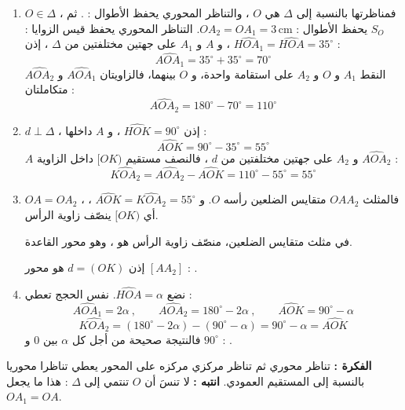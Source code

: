 \documentclass[12pt,a4paper]{article}
\newcommand{\cm}{\,\mathrm{cm}}
\begin{document}
\begin{corr}[title={تركيب : تناظر محوري ثم مركزي}, stars=4, source={Axiomaths}]
\begin{enumerate}[itemsep=14pt]
\begin{center}
\begin{tikzpicture}[scale=0.8]
  \end{tikzpicture}
  \end{center}
  \item $O\in\Delta$ ، فمناظرتها بالنسبة إلى $\Delta$ هي $O$ ، والتناظر المحوري يحفظ الأطوال : \ib{$OA_1=OA=3\cm$}. ثم $S_O$ يحفظ الأطوال : $OA_2=OA_1=3\cm$.
  التناظر المحوري يحفظ قيس الزوايا : $\widehat{HOA_1}=\widehat{HOA}=35^\circ$ ، و $A$ و $A_1$ على جهتين مختلفتين من $\Delta$ ، إذن :
  \[\widehat{AOA_1}=35^\circ+35^\circ=70^\circ\]
  النقط $A_1$ و $O$ و $A_2$ على استقامة واحدة، و $O$ بينهما، فالزاويتان $\widehat{AOA_1}$ و $\widehat{AOA_2}$ متكاملتان :
  \[\widehat{AOA_2}=180^\circ-70^\circ=110^\circ\]
  \item $d\perp\Delta$ ، إذن $\widehat{HOK}=90^\circ$ ، و $A$ داخلها :
  \[\widehat{AOK}=90^\circ-35^\circ=55^\circ\]
  $A$ و $A_2$ على جهتين مختلفتين من $d$ ، فالنصف مستقيم $[OK)$ داخل الزاوية $\widehat{AOA_2}$ :
  \[\widehat{KOA_2}=\widehat{AOA_2}-\widehat{AOK}=110^\circ-55^\circ=55^\circ\]
  \item $OA=OA_2$ ، فالمثلث $OAA_2$ متقايس الضلعين رأسه $O$. و $\widehat{AOK}=\widehat{KOA_2}=55^\circ$ ، أي $[OK)$ ينصّف زاوية الرأس.
  \begin{prop}
  في مثلث متقايس الضلعين، منصّف زاوية الرأس هو ، وهو محور القاعدة.
  \end{prop}
  إذن $d=(OK)$ هو محور $[AA_2]$ : .
  \item نضع $\widehat{HOA}=\alpha$. نفس الحجج تعطي :
  \[\widehat{AOA_1}=2\alpha\ ,\qquad \widehat{AOA_2}=180^\circ-2\alpha\ ,\qquad \widehat{AOK}=90^\circ-\alpha\]
  \[\widehat{KOA_2}=(180^\circ-2\alpha)-(90^\circ-\alpha)=90^\circ-\alpha=\widehat{AOK}\]
  فالنتيجة صحيحة من أجل كل $\alpha$ بين $0$ و $90^\circ$ : .
\end{enumerate}
\textbf{الفكرة :} تناظر محوري ثم تناظر مركزي مركزه على المحور يعطي تناظرا محوريا بالنسبة إلى المستقيم العمودي. \quad \textbf{انتبه :} لا تنسَ أن $O$ تنتمي إلى $\Delta$ : هذا ما يجعل $OA_1=OA$.
\end{corr}
\end{document}
